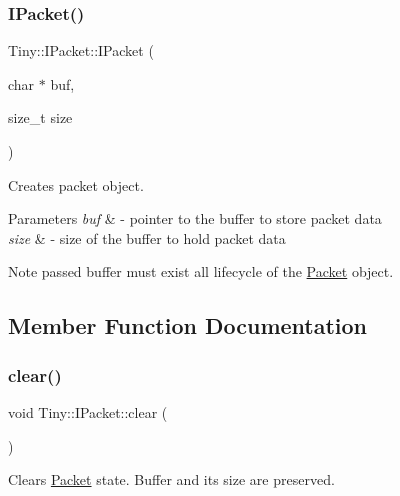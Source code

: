 \subsubsection{\texorpdfstring{I\+Packet()}{IPacket()}}
{\footnotesize\ttfamily Tiny\+::\+I\+Packet\+::\+I\+Packet (\begin{DoxyParamCaption}\item[{char $\ast$}]{buf,  }\item[{size\+\_\+t}]{size }\end{DoxyParamCaption})\hspace{0.3cm}{\ttfamily [inline]}}

Creates packet object. 
\begin{DoxyParams}{Parameters}
{\em buf} & -\/ pointer to the buffer to store packet data \\
\hline
{\em size} & -\/ size of the buffer to hold packet data \\
\hline
\end{DoxyParams}
\begin{DoxyNote}{Note}
passed buffer must exist all lifecycle of the \hyperlink{classTiny_1_1Packet}{Packet} object. 
\end{DoxyNote}


\subsection{Member Function Documentation}
\mbox{\label{classTiny_1_1IPacket_a6cc28c5235de6a9ce68bea546a4db17c}} 
\subsubsection{\texorpdfstring{clear()}{clear()}}
{\footnotesize\ttfamily void Tiny\+::\+I\+Packet\+::clear (\begin{DoxyParamCaption}{ }\end{DoxyParamCaption})\hspace{0.3cm}{\ttfamily [inline]}}

Clears \hyperlink{classTiny_1_1Packet}{Packet} state. Buffer and its size are preserved. \mbox{\label{classTiny_1_1IPacket_aedf2ba31c5a29e3829458bd9f03a7051}} 

